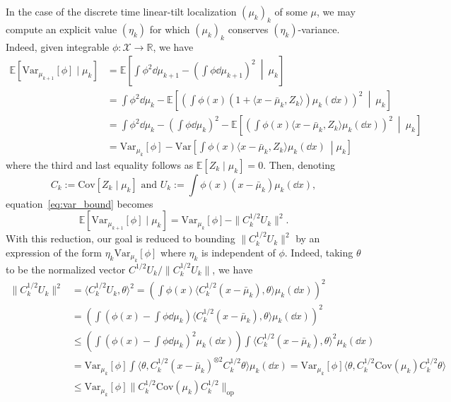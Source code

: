 In the case of the discrete time linear-tilt localization \((\mu_k)_k\) of some \(\mu\), we may compute 
an explicit value \((\eta_k)\) for which \((\mu_k)_k\) conserves \((\eta_k)\)-variance. Indeed, 
given integrable \(\phi : \mathcal{X} \to \mathbb{R}\), we have
\begin{equation}\label{eq:var_bound}
  \begin{split}
    \mathbb{E}[\text{Var}_{\mu_{k + 1}}[\phi] \mid \mu_k] 
    & = \mathbb{E}\left[\int\phi^2 \dd \mu_{k + 1} - \left(\int \phi \dd \mu_{k + 1}\right)^2\ \middle\vert\ \mu_k \right]\\
    & = \int \phi^2 \dd \mu_k - \mathbb{E}\left[\left(\int \phi(x) 
          (1 + \langle x - \bar{\mu}_k, Z_k\rangle)\mu_k(\dd x)\right)^2\ \middle\vert\ \mu_k\right]\\
    & = \int \phi^2 \dd \mu_k - \left(\int \phi \dd \mu_k\right)^2 -
          \mathbb{E}\left[\left(\int \phi(x) \langle x - \bar{\mu}_k, Z_k\rangle\mu_k(\dd x)\right)^2\ \middle\vert\ \mu_k\right]\\
    & = \text{Var}_{\mu_k}[\phi] - 
          \text{Var}\left[\int \phi(x) \langle x - \bar{\mu}_k, Z_k\rangle\mu_k(\dd x)\ \middle\vert \mu_k\right]
  \end{split}
\end{equation}
where the third and last equality follows as \(\mathbb{E}[Z_k \mid \mu_k] = 0\). Then, denoting 
\[C_k := \text{Cov}[Z_k \mid \mu_k] \text{ and } U_k := \int \phi(x)(x - \bar{\mu}_k) \mu_k(\dd x),\]
equation~\eqref{eq:var_bound} becomes
\[\mathbb{E}[\text{Var}_{\mu_{k + 1}}[\phi] \mid \mu_k] = \text{Var}_{\mu_k}[\phi] - \|C_k^{1 / 2}U_k\|^2.\]
With this reduction, our goal is reduced to bounding \(\|C_k^{1 / 2}U_k\|^2\) by an expression of 
the form \(\eta_k \text{Var}_{\mu_k}[\phi]\) where \(\eta_k\) is independent of \(\phi\). Indeed, 
taking \(\theta\) to be the normalized vector \(C^{1/ 2}U_k / \|C_k^{1 / 2}U_k\|\), we have
\begin{align*}
  \|C_k^{1 / 2} U_k\|^2 & = \langle C_k^{1 / 2} U_k, \theta\rangle^2 
    = \left(\int \phi(x)\langle C_k^{1 / 2}(x - \bar{\mu}_k), \theta \rangle \mu_k(\dd x)\right)^2\\
  & = \left(\int \left(\phi(x) - \int \phi \dd\mu_k\right) \langle C_k^{1 / 2}(x - \bar{\mu}_k), \theta \rangle \mu_k(\dd x)\right)^2\\
  & \le \left(\int \left(\phi(x) - \int \phi \dd\mu_k\right)^2 \mu_k(\dd x)\right)\int \langle C_k^{1 / 2}(x - \bar{\mu}_k), \theta \rangle^2 \mu_k(\dd x)\\
  & = \text{Var}_{\mu_k}[\phi]\int \langle \theta, C_k^{1 / 2}(x - \bar{\mu}_k)^{\otimes 2} C_k^{1 / 2} \theta \rangle \mu_k(\dd x)
    = \text{Var}_{\mu_k}[\phi]\langle \theta, C_k^{1 / 2}\text{Cov}(\mu_k) C_k^{1 / 2} \theta\rangle\\
  & \le \text{Var}_{\mu_k}[\phi]\|C_k^{1/ 2}\text{Cov}(\mu_k) C_k^{1 / 2}\|_{\text{op}}
\end{align*}
